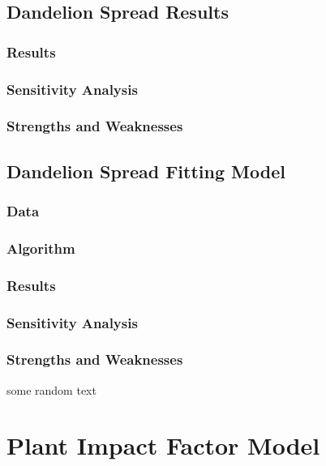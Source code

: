 \documentclass[12pt]{article}
\begin{document}
	\subsection{Dandelion Spread Results}
	
		\subsubsection{Results}
		
		\subsubsection{Sensitivity Analysis}
		
		\subsubsection{Strengths and Weaknesses}
		
	\subsection{Dandelion Spread Fitting Model}
		
		\subsubsection{Data}
		
		\subsubsection{Algorithm}
		
		\subsubsection{Results}
		
		\subsubsection{Sensitivity Analysis}
		
		\subsubsection{Strengths and Weaknesses}
	
		some random text
		
\section{Plant Impact Factor Model}
\end{document}
